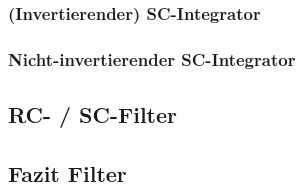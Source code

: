 \subsubsection{(Invertierender) SC-Integrator}


\subsubsection{Nicht-invertierender SC-Integrator}


\subsection{RC- / SC-Filter}


\subsection{Fazit Filter}